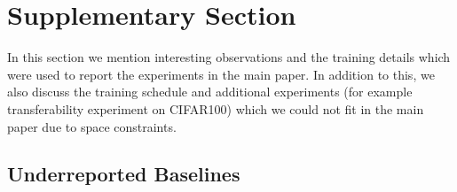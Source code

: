 \documentclass[10pt,twocolumn,letterpaper]{article}
\begin{document}
\newpage
\onecolumn
\setcounter{section}{0}
\setcounter{table}{0}
\section{Supplementary Section}
In this section we mention interesting observations and the training details which were used to report the experiments in the main paper. In addition to this, we also 
discuss the training schedule and additional experiments (for example transferability experiment on CIFAR100) which we could not fit in the main paper due to space constraints.

\subsection{Underreported Baselines}

\begin{table*}[ht]
    \centering
               
                \caption{Reported Random Baseline vs our RSB results. We denote RSB results with strong regularization by RSB-SR.} 

                \label{tab:baselines_vs_reported_results}
                \vspace{-1em}
\end{table*}
\end{document}
